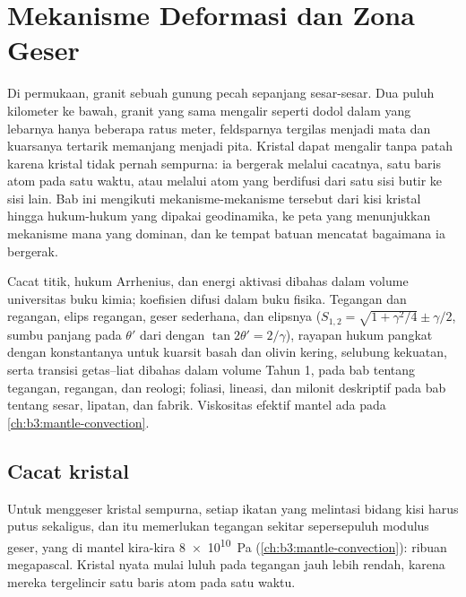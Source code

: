 \chapter{Mekanisme Deformasi dan Zona Geser}\label{ch:b3:deformation-mechanisms}

Di permukaan, granit sebuah gunung pecah sepanjang sesar-sesar.
Dua puluh kilometer ke bawah, granit yang sama mengalir seperti dodol dalam  yang lebarnya
hanya beberapa ratus meter, feldsparnya tergilas menjadi mata dan kuarsanya tertarik memanjang
menjadi pita. Kristal dapat mengalir tanpa patah karena kristal tidak pernah sempurna:
ia bergerak melalui cacatnya, satu baris atom pada satu waktu, atau melalui atom yang
berdifusi dari satu sisi butir ke sisi lain. Bab ini mengikuti mekanisme-mekanisme tersebut dari kisi
kristal hingga hukum-hukum yang dipakai geodinamika, ke peta yang menunjukkan mekanisme mana yang
dominan, dan ke  tempat batuan mencatat bagaimana ia bergerak.

\begin{recall}
Cacat titik, hukum Arrhenius, dan energi aktivasi dibahas dalam
volume universitas buku kimia; koefisien difusi dalam
buku fisika. Tegangan dan regangan, elips regangan, geser sederhana, dan elipsnya
($S_{1,2} = \sqrt{1 + \gamma^2/4} \pm \gamma/2$, sumbu panjang pada $\theta'$ dari
 dengan $\tan2\theta' = 2/\gamma$), rayapan hukum pangkat dengan
konstantanya untuk kuarsit basah dan olivin kering, selubung kekuatan, serta
transisi getas--liat dibahas dalam volume Tahun 1, pada bab tentang
tegangan, regangan, dan reologi; foliasi, lineasi, dan
milonit deskriptif pada bab tentang sesar, lipatan, dan fabrik. Viskositas efektif
mantel ada pada \cref{ch:b3:mantle-convection}.
\end{recall}

\section{Cacat kristal}

Untuk menggeser kristal sempurna, setiap ikatan yang melintasi bidang kisi harus
putus sekaligus, dan itu memerlukan tegangan sekitar sepersepuluh modulus geser,
yang di mantel kira-kira \qty{8e10}{Pa}
(\cref{ch:b3:mantle-convection}): ribuan megapascal. Kristal nyata mulai luluh
pada tegangan jauh lebih rendah, karena mereka tergelincir satu baris atom pada satu waktu.

